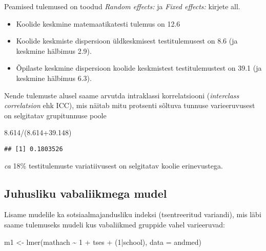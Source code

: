 \documentclass[
]{book}
\newenvironment{Shaded}{\begin{snugshade}}{\end{snugshade}}
\newcommand{\AttributeTok}[1]{\textcolor[rgb]{0.77,0.63,0.00}{#1}}
\newcommand{\DecValTok}[1]{\textcolor[rgb]{0.00,0.00,0.81}{#1}}
\newcommand{\FloatTok}[1]{\textcolor[rgb]{0.00,0.00,0.81}{#1}}
\newcommand{\FunctionTok}[1]{\textcolor[rgb]{0.00,0.00,0.00}{#1}}
\newcommand{\NormalTok}[1]{#1}
\newcommand{\OtherTok}[1]{\textcolor[rgb]{0.56,0.35,0.01}{#1}}
\newcommand{\SpecialCharTok}[1]{\textcolor[rgb]{0.00,0.00,0.00}{#1}}
\providecommand{\tightlist}{%
  \setlength{\itemsep}{0pt}\setlength{\parskip}{0pt}}
\begin{document}
Peamised tulemused on toodud \emph{Random effects:} ja \emph{Fixed effects:} kirjete all.

\begin{itemize}
\tightlist
\item
  Koolide keskmine matemaatikatesti tulemus on 12.6
\item
  Koolide keskmiste dispersioon üldkeskmisest testitulemusest on 8.6 (ja keskmine hälbimus 2.9).\\
\item
  Õpilaste keskmine dispersioon koolide keskmistest testitulemustest on 39.1 (ja keskmine hälbimus 6.3).
\end{itemize}

Nende tulemuste alusel saame arvutda intraklassi korrelatsiooni (\emph{interclass correlatsion} ehk ICC), mis näitab mitu protsenti sõltuva tunnuse varieeruvusest on selgitatav grupitunnuse poole

\begin{Shaded}
\begin{Highlighting}[]
\FloatTok{8.614}\SpecialCharTok{/}\NormalTok{(}\FloatTok{8.614+39.148}\NormalTok{)}
\end{Highlighting}
\end{Shaded}

\begin{verbatim}
## [1] 0.1803526
\end{verbatim}

\emph{ca} 18\% testitulemuste variatiivusest on selgitatav koolie erinevustega.

\hypertarget{juhusliku-vabaliikmega-mudel}{%
\subsection{Juhusliku vabaliikmega mudel}\label{juhusliku-vabaliikmega-mudel}}

Lisame mudelile ka sotsiaalmajandusliku indeksi (tsentreeritud variandi), mis läbi saame tulemuseks mudeli kus vabaliikmed gruppide vahel varieeruvad:

\begin{Shaded}
\begin{Highlighting}[]
\NormalTok{m1 }\OtherTok{\textless{}{-}} \FunctionTok{lmer}\NormalTok{(mathach }\SpecialCharTok{\textasciitilde{}} \DecValTok{1} \SpecialCharTok{+}\NormalTok{ tses }\SpecialCharTok{+}\NormalTok{ (}\DecValTok{1}\SpecialCharTok{|}\NormalTok{school), }\AttributeTok{data =}\NormalTok{ andmed)}
\end{Highlighting}
\end{Shaded}
\end{document}
